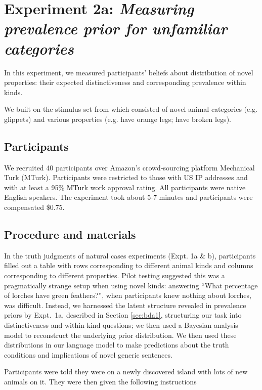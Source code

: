 \documentclass[10pt,letterpaper]{article}
\begin{document}
\section{Experiment 2a: \emph{Measuring prevalence prior for unfamiliar categories}}

In this experiment, we measured participants' beliefs about distribution of novel properties: their expected distinctiveness and corresponding prevalence within kinds.

We built on the stimulus set from  which consisted of novel animal categories (e.g. glippets) and various properties (e.g. have orange legs; have broken legs).


\subsection{Participants}

We recruited 40 participants over Amazon's crowd-sourcing platform Mechanical Turk (MTurk).  
Participants were restricted to those with US IP addresses and with at least a 95\% MTurk work approval rating. 
All participants were native English speakers. 
The experiment took about 5-7 minutes and participants were compensated \$0.75.

\subsection{Procedure and materials}

In the truth judgments of natural cases experiments (Expt. 1a \& b), participants filled out a table with rows corresponding to different animal kinds and columns corresponding to different properties. 
Pilot testing suggested this was a pragmatically strange setup when using novel kinds: answering ``What percentage of lorches have green feathers?'', when participants knew nothing about lorches, was difficult.
Instead, we harnessed the latent structure revealed in prevalence priors by Expt.~1a, described in Section \ref{sec:bda1}, structuring our task into distinctiveness and within-kind questions; we then used a Bayesian analysis model to reconstruct the underlying prior distribution. 
We then used these distributions in our language model to make predictions about the truth conditions and implications of novel generic sentences.


Participants were told they were on a newly discovered island with lots of new animals on it. They were then given the following instructions
\end{document}
